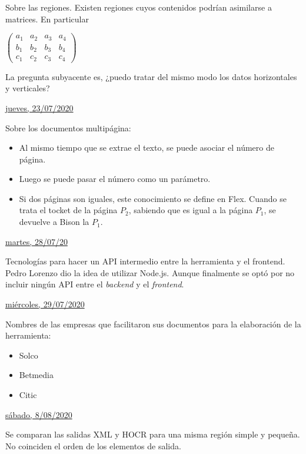 Sobre las regiones. Existen regiones cuyos contenidos podrían asimilarse a matrices. En particular 

\begin{math}
\begin{pmatrix}
  a_1 & a_2 & a_3 & a_4 \\
  b_1 & b_2 & b_3 & b_4 \\
  c_1 & c_2 & c_3 & c_4
\end{pmatrix}
\end{math}

La pregunta subyacente es, ¿puedo tratar del mismo modo los datos horizontales y verticales?

\underline{jueves, 23/07/2020}

Sobre los documentos multipágina:
\begin{itemize}
    \item Al mismo tiempo que se extrae el texto, se puede asociar el número de página.
    \item Luego se puede pasar el número como un parámetro.
    \item Si dos páginas son iguales, este conocimiento se define en Flex. Cuando se trata el tocket de la página $P_2$, sabiendo que es igual a la página $P_1$, se devuelve a Bison la $P_1$.
\end{itemize}

\underline{martes, 28/07/20}

Tecnologías para hacer un API intermedio entre la herramienta y el frontend. Pedro Lorenzo dio la idea de utilizar Node.js. Aunque finalmente se optó por no incluir ningún API entre el \emph{backend} y el \emph{frontend}.

\underline{miércoles, 29/07/2020}

Nombres de las empresas que facilitaron sus documentos para la elaboración de la herramienta:
\begin{itemize}
    \item Solco
    \item Betmedia
    \item Citic
\end{itemize}

\underline{sábado, 8/08/2020}

Se comparan las salidas XML y HOCR para una misma región simple y pequeña. No coinciden el orden de los elementos de salida.